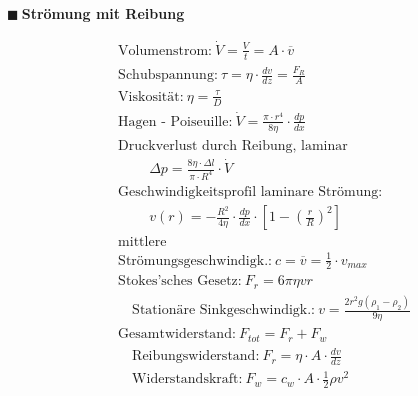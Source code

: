 \documentclass[a4paper,10pt]{article}
\renewcommand{\textbf}[1]{\textsf{{\bfseries {#1}}}}
\renewcommand{\plmtsquare}{{\color{miugray} $\blacksquare~$}}
\begin{document}
\begin{minipage}[t]{.55\textwidth}
\vspace*{8mm}
\plmtsquare \textbf{Strömung mit Reibung}\par \vspace*{-4mm}
\begin{align*}
&\text{Volumenstrom:}	~ \dot{V} = \frac{V}{t} = A \cdot \overline{v}\\
&\text{Schubspannung:}	~ \tau = \eta \cdot \frac{d v}{d z} = \frac{F_{R}}{A} \\
&\text{Viskosität:}	~ \eta = \frac{\tau}{D} \\
&\text{Hagen - Poiseuille:} ~ \dot{V} = \frac{\pi \cdot r^4}{8\eta} \cdot \frac{d p}{d x}\\
&\text{Druckverlust durch Reibung, laminar}\\
& \qquad ~ \Delta p = \frac{8\eta \cdot \Delta l}{\pi \cdot R^4} \cdot \dot{V}\\
&\text{Geschwindigkeitsprofil laminare Strömung:}\\
&\qquad ~ v(r) = -\frac{R^2}{4\eta} \cdot \frac{dp}{dx} \cdot \left[ 1 - \left(\frac{r}{R}\right)^2 \right]\\
&\text{mittlere}\\[-10pt] &\text{Strömungsgeschwindigk.:} ~  c = \overline{v} = \frac{1}{2} \cdot v_{max}\\ 
&\text{Stokes'sches Gesetz:} ~ F_r = 6 \pi \eta v r \\[-4pt]
&\quad \text{Stationäre Sinkgeschwindigk.:} ~ v = \frac{2r^2g(\rho_1-\rho_2)}{9\eta} \\[5pt]
&\text{Gesamtwiderstand:} ~ F_{tot} = F_r + F_w\\[-4pt]
&\quad \text{Reibungswiderstand:}  ~ F_r = \eta \cdot A \cdot \frac{d v}{d z}\\[-2pt]
&\quad \text{Widerstandskraft:}  ~ F_w = c_w \cdot A \cdot \frac{1}{2} \rho v^2 \\
\\ 
\end{align*}
\vspace*{-12mm}


\end{minipage}
\end{document}

